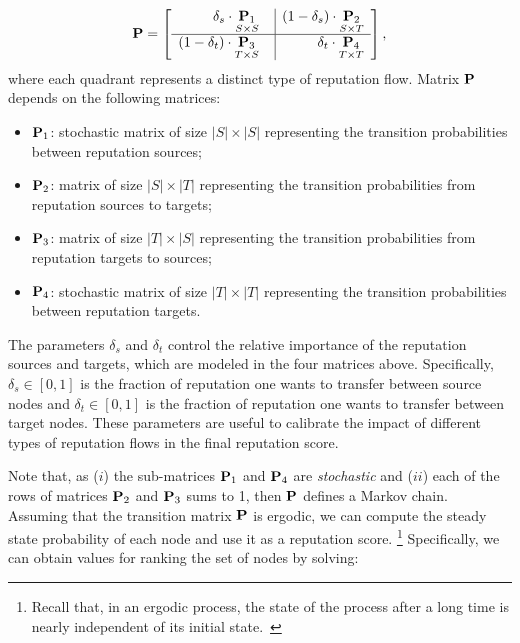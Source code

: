 \documentclass[msc]{ppgccufmg}
\begin{document}
\newcommand{\bkt}[1]{ {^{\langle #1 \rangle}} }

\begin{align}\label{eq:newp}
{\bf P} =
\left[
\begin{array}{r | r}    
    \delta_{s} \cdot \underset{S \times S}{{\bf P}_1} \ \ & (1-\delta_{s}) \cdot \underset{S \times T}{{\bf P}_2} \\ 
    \hline
    (1-\delta_{t}) \cdot \underset{T \times S}{{\bf P}_3} \ \ & \delta_{t} \cdot \underset{T \times T}{{\bf P}_4} \\
\end{array}
\right],
\end{align}
\noindent where each quadrant represents a distinct type of reputation flow. Matrix ${\bf P}$ depends on the following matrices:

\begin{itemize}
    \item ${\bf P}_1$: stochastic matrix of size $|S|\times |S|$ representing the transition probabilities between reputation sources;
    \item ${\bf P}_2$: matrix of size $|S|\times |T|$ representing the transition probabilities from reputation sources to targets;
    \item ${\bf P}_3$: matrix of size $|T|\times |S|$ representing the transition probabilities from reputation targets to sources;
    \item ${\bf P}_4$: stochastic matrix of size $|T|\times |T|$ representing the transition probabilities between reputation targets.
\end{itemize}

The parameters $\delta_{s}$ and $\delta_{t}$ control the relative importance of the reputation sources and targets, which are modeled in the four matrices above. Specifically, $\delta_{s} \in [0,1]$ is the fraction of reputation one wants to transfer between source nodes and $\delta_{t} \in [0,1]$ is the fraction of reputation one wants to transfer between target nodes. These parameters are useful to calibrate the impact of different types of reputation flows in the final reputation score.

Note that, as ($i$) the sub-matrices ${\bf P}_1$ and ${\bf P}_4$ are \emph{stochastic} and ($ii$) each of the rows of matrices ${\bf P}_2$ and ${\bf P}_3$ sums to 1, then ${\bf P}$ defines a Markov chain. Assuming that the transition matrix ${\bf P}$ is ergodic, we can compute the steady state probability of each node and use it as a reputation score.%
%
\footnote{Recall that, in an ergodic process, the state of the process after a long time is nearly independent of its initial state.~\citep{walters00}}
%
Specifically, we can obtain values for ranking the set of nodes by solving:
\end{document}
